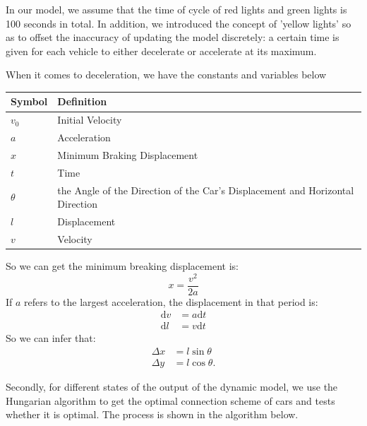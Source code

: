 \documentclass[12pt]{article}
\theoremstyle{definition}
\theoremstyle{remark}
\numberwithin{equation}{section}
\begin{document}
	In our model, we assume that the time of cycle of red lights and green lights is 100 seconds in total. In addition, we introduced the concept of 'yellow lights' so as to offset the inaccuracy of updating the model discretely: a certain time is given for each vehicle to either decelerate or accelerate at its maximum. 
	
	When it comes to deceleration, we have the constants and variables below
	\begin{center}
	\begin{tabular}{ll}
		\hline
		Symbol&Definition\\
		\hline
		$v_0$&Initial Velocity\\
		$a$&Acceleration\\
		$x$&Minimum Braking Displacement\\
		$t$&Time\\
		$\theta$&the Angle of the Direction of the Car's Displacement and Horizontal Direction\\
		$l$&Displacement\\
		$v$&Velocity\\
		\hline
	\end{tabular}
	\end{center}
	
	So we can get the minimum breaking displacement is:
	$$x=\frac{v^2}{2a}$$
	If $a$ refers to the largest acceleration, the displacement in that period is:
	\begin{align*}
	\mathrm{d}v &=a\mathrm{d}t\\
	\mathrm{d}l &=v\mathrm{d}t
	\end{align*}
	So we can infer that:
	\begin{align*}
	 \Delta x &= l\sin \theta\\
	 \Delta y &= l\cos \theta.
	\end{align*}

	Secondly, for different states of the output of the dynamic model, we use the Hungarian algorithm to get the optimal connection scheme of cars and tests whether it is optimal. The process is shown in the algorithm below.
	
\end{document}
